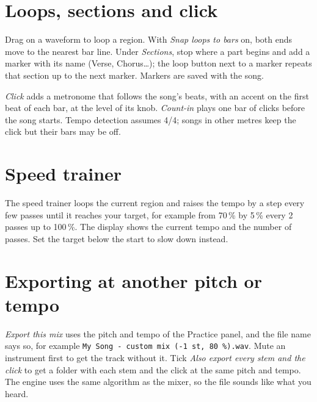 \documentclass{covermaker}
\begin{document}
\section{Loops, sections and click}
Drag on a waveform to loop a region. With \emph{Snap loops to bars} on, both
ends move to the nearest bar line. Under \emph{Sections}, stop where a part
begins and add a marker with its name (Verse, Chorus\dots); the loop button
next to a marker repeats that section up to the next marker. Markers are saved
with the song.

\emph{Click} adds a metronome that follows the song's beats, with an accent
on the first beat of each bar, at the level of its knob. \emph{Count-in} plays
one bar of clicks before the song starts. Tempo detection assumes 4/4; songs
in other metres keep the click but their bars may be off.

\section{Speed trainer}
The speed trainer loops the current region and raises the tempo by a step
every few passes until it reaches your target, for example from 70\,\% by
5\,\% every 2 passes up to 100\,\%. The display shows the current tempo and the
number of passes. Set the target below the start to slow down instead.

\section{Exporting at another pitch or tempo}
\emph{Export this mix} uses the pitch and tempo of the Practice panel, and the
file name says so, for example \texttt{My Song - custom mix (-1 st, 80 \%).wav}.
Mute an instrument first to get the track without it. Tick \emph{Also export
every stem and the click} to get a folder with each stem and the click at the
same pitch and tempo. The engine uses the same algorithm as the mixer, so the
file sounds like what you heard.
\end{document}
